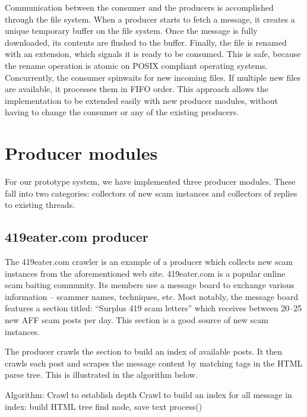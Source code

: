 Communication between the consumer and the producers is accomplished through the file system. When a producer starts to fetch a message, it creates a unique temporary buffer on the file system. Once the message is fully downloaded, its contents are flushed to the buffer. Finally, the file is renamed with an extension, which signals it is ready to be consumed. This is safe, because the rename operation is atomic on POSIX compliant operating systems. Concurrently, the consumer spinwaits for new incoming files. If multiple new files are available, it processes them in FIFO order. This approach allows the implementation to be extended easily with new producer modules, without having to change the consumer or any of the existing producers.

\section{Producer modules}
For our prototype system, we have implemented three producer modules. These fall into two categories: collectors of new scam instances and collectors of replies to existing threads.

\subsection{419eater.com producer}
The 419eater.com crawler is an example of a producer which collects new scam instances from the aforementioned web site. 419eater.com is a popular online scam baiting community. Its members use a message board to exchange various information -- scammer names, techniques, etc. Most notably, the message board features a section titled: ``Surplus 419 scam letters'' which receives between 20--25 new AFF scam posts per day. This section is a good source of new scam instances.

The producer crawls the section to build an index of available posts. It then crawls each post and scrapes the message content by matching tags in the HTML parse tree. This is illustrated in the algorithm below.

Algorithm:
	Crawl to establish depth
	Crawl to build an index
	for all message in index:
		build HTML tree
		find node, save text
		process()


